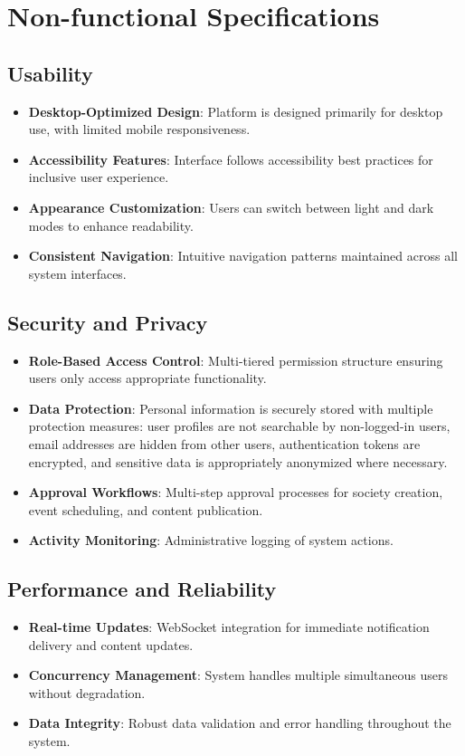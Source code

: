 \section{Non-functional Specifications}

\subsection{Usability}
\begin{itemize}
    \item \textbf{Desktop-Optimized Design}: Platform is designed primarily for desktop use, with limited mobile responsiveness. 
    \item \textbf{Accessibility Features}: Interface follows accessibility best practices for inclusive user experience.
    \item \textbf{Appearance Customization}: Users can switch between light and dark modes to enhance readability.
    \item \textbf{Consistent Navigation}: Intuitive navigation patterns maintained across all system interfaces.
\end{itemize}

\subsection{Security and Privacy}
\begin{itemize}
    \item \textbf{Role-Based Access Control}: Multi-tiered permission structure ensuring users only access appropriate functionality.
    \item \textbf{Data Protection}: Personal information is securely stored with multiple protection measures: user profiles are not searchable by non-logged-in users, email addresses are hidden from other users, authentication tokens are encrypted, and sensitive data is appropriately anonymized where necessary.
    \item \textbf{Approval Workflows}: Multi-step approval processes for society creation, event scheduling, and content publication.
    \item \textbf{Activity Monitoring}: Administrative logging of system actions.
\end{itemize}

\subsection{Performance and Reliability}
\begin{itemize}
    \item \textbf{Real-time Updates}: WebSocket integration for immediate notification delivery and content updates.
    \item \textbf{Concurrency Management}: System handles multiple simultaneous users without degradation.
    \item \textbf{Data Integrity}: Robust data validation and error handling throughout the system.
\end{itemize}

